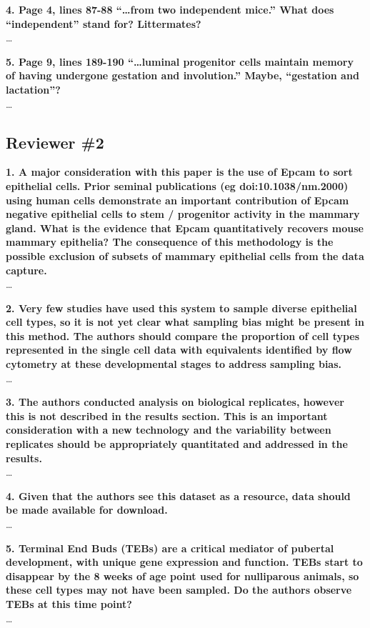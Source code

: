 \documentclass{article}
\begin{document}
\textbf{4. Page 4, lines 87-88 “…from two independent mice.” What does “independent” stand for? Littermates?}\\
\ldots

\textbf{5. Page 9, lines 189-190 “…luminal progenitor cells maintain memory of having undergone gestation and involution.” Maybe, “gestation and lactation”?}\\
\ldots

\subsection*{Reviewer \#2}
\textbf{1. A major consideration with this paper is the use of Epcam to sort epithelial cells. Prior seminal publications (eg doi:10.1038/nm.2000) using human cells demonstrate an important contribution of Epcam negative epithelial cells to stem / progenitor activity in the mammary gland. What is the evidence that Epcam quantitatively recovers mouse mammary epithelia? The consequence of this methodology is the possible exclusion of subsets of mammary epithelial cells from the data capture.}\\
\ldots

\textbf{2. Very few studies have used this system to sample diverse epithelial cell types, so it is not yet clear what sampling bias might be present in this method. The authors should compare the proportion of cell types represented in the single cell data with equivalents identified by flow cytometry at these developmental stages to address sampling bias.}\\
\ldots

\textbf{3. The authors conducted analysis on biological replicates, however this is not described in the results section. This is an important consideration with a new technology and the variability between replicates should be appropriately quantitated and addressed in the results. }\\
\ldots

\textbf{4. Given that the authors see this dataset as a resource, data should be made available for download.}\\
\ldots

\textbf{5. Terminal End Buds (TEBs) are a critical mediator of pubertal development, with unique gene expression and function. TEBs start to disappear by the 8 weeks of age point used for nulliparous animals, so these cell types may not have been sampled. Do the authors observe TEBs at this time point?}\\
\ldots
\end{document}
